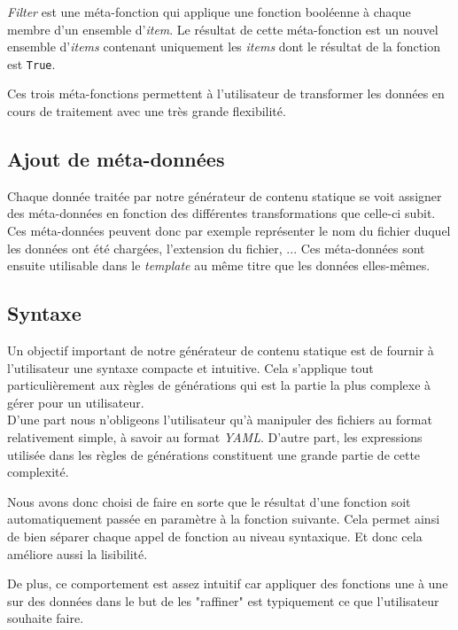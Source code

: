 		\textit{Filter} est une méta-fonction qui applique une fonction booléenne à chaque membre d'un ensemble d'\textit{item}. Le résultat de cette méta-fonction est un nouvel ensemble d'\textit{items} contenant uniquement les \textit{items} dont le résultat de la fonction est \texttt{True}.
		
		Ces trois méta-fonctions permettent à l'utilisateur de transformer les données en cours de traitement avec une très grande flexibilité.
	
	\subsection{Ajout de méta-données}
	
		Chaque donnée traitée par notre générateur de contenu statique se voit assigner des méta-données en fonction des différentes transformations que celle-ci subit. Ces méta-données peuvent donc par exemple représenter le nom du fichier duquel les données ont été chargées, l'extension du fichier, ... Ces méta-données sont ensuite utilisable dans le \textit{template} au même titre que les données elles-mêmes.
		
	\subsection*{Syntaxe}
	
		Un objectif important de notre générateur de contenu statique est de fournir à l'utilisateur une syntaxe compacte et intuitive. Cela s'applique tout particulièrement aux règles de générations qui est la partie la plus complexe à gérer pour un utilisateur.\\
		
		D'une part nous n'obligeons l'utilisateur qu'à manipuler des fichiers au format relativement simple, à savoir au format \textit{YAML}. D'autre part, les expressions utilisée dans les règles de générations constituent une grande partie de cette complexité.
		
		Nous avons donc choisi de faire en sorte que le résultat d'une fonction soit automatiquement passée en paramètre à la fonction suivante. Cela permet ainsi de bien séparer chaque appel de fonction au niveau syntaxique. Et donc cela améliore aussi la lisibilité.
		
		De plus, ce comportement est assez intuitif car appliquer des fonctions une à une sur des données dans le but de les "raffiner" est typiquement ce que l'utilisateur souhaite faire. 
	
